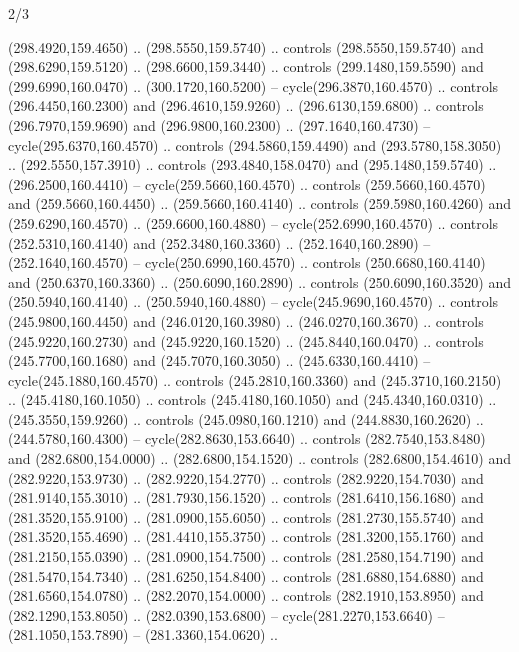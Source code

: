 \begin{flagdescription}{2/3}
\begin{scope}[xshift=0.5\flaglength,yshift=0.5\flagwidth,scale=\flagwidth/259.2]
\begin{scope}[y=0.8pt, x=0.8pt, yscale=-1,shift={(-243,-162)}]
      (298.4920,159.4650) .. (298.5550,159.5740) .. controls (298.5550,159.5740) and
      (298.6290,159.5120) .. (298.6600,159.3440) .. controls (299.1480,159.5590) and
      (299.6990,160.0470) .. (300.1720,160.5200) -- cycle(296.3870,160.4570) ..
      controls (296.4450,160.2300) and (296.4610,159.9260) .. (296.6130,159.6800) ..
      controls (296.7970,159.9690) and (296.9800,160.2300) .. (297.1640,160.4730) --
      cycle(295.6370,160.4570) .. controls (294.5860,159.4490) and
      (293.5780,158.3050) .. (292.5550,157.3910) .. controls (293.4840,158.0470) and
      (295.1480,159.5740) .. (296.2500,160.4410) -- cycle(259.5660,160.4570) ..
      controls (259.5660,160.4570) and (259.5660,160.4450) .. (259.5660,160.4140) ..
      controls (259.5980,160.4260) and (259.6290,160.4570) .. (259.6600,160.4880) --
      cycle(252.6990,160.4570) .. controls (252.5310,160.4140) and
      (252.3480,160.3360) .. (252.1640,160.2890) -- (252.1640,160.4570) --
      cycle(250.6990,160.4570) .. controls (250.6680,160.4140) and
      (250.6370,160.3360) .. (250.6090,160.2890) .. controls (250.6090,160.3520) and
      (250.5940,160.4140) .. (250.5940,160.4880) -- cycle(245.9690,160.4570) ..
      controls (245.9800,160.4450) and (246.0120,160.3980) .. (246.0270,160.3670) ..
      controls (245.9220,160.2730) and (245.9220,160.1520) .. (245.8440,160.0470) ..
      controls (245.7700,160.1680) and (245.7070,160.3050) .. (245.6330,160.4410) --
      cycle(245.1880,160.4570) .. controls (245.2810,160.3360) and
      (245.3710,160.2150) .. (245.4180,160.1050) .. controls (245.4180,160.1050) and
      (245.4340,160.0310) .. (245.3550,159.9260) .. controls (245.0980,160.1210) and
      (244.8830,160.2620) .. (244.5780,160.4300) -- cycle(282.8630,153.6640) ..
      controls (282.7540,153.8480) and (282.6800,154.0000) .. (282.6800,154.1520) ..
      controls (282.6800,154.4610) and (282.9220,153.9730) .. (282.9220,154.2770) ..
      controls (282.9220,154.7030) and (281.9140,155.3010) .. (281.7930,156.1520) ..
      controls (281.6410,156.1680) and (281.3520,155.9100) .. (281.0900,155.6050) ..
      controls (281.2730,155.5740) and (281.3520,155.4690) .. (281.4410,155.3750) ..
      controls (281.3200,155.1760) and (281.2150,155.0390) .. (281.0900,154.7500) ..
      controls (281.2580,154.7190) and (281.5470,154.7340) .. (281.6250,154.8400) ..
      controls (281.6880,154.6880) and (281.6560,154.0780) .. (282.2070,154.0000) ..
      controls (282.1910,153.8950) and (282.1290,153.8050) .. (282.0390,153.6800) --
      cycle(281.2270,153.6640) -- (281.1050,153.7890) -- (281.3360,154.0620) ..

\end{scope}
\end{scope}
\end{flagdescription}
